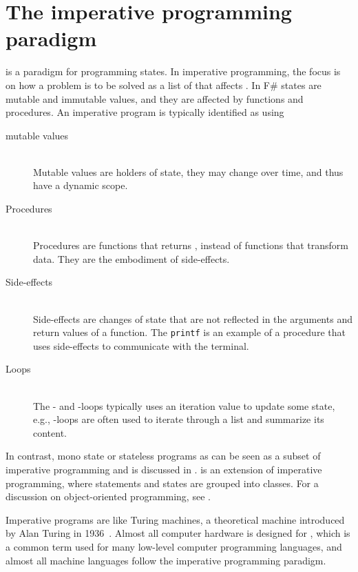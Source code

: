 \chapter{The imperative programming paradigm}
\label{chap:imperative}
 is a paradigm for programming states. In imperative programming, the focus is on how a problem is to be solved as a list of  that affects . In F\# states are mutable and immutable values, and they are affected by functions and procedures. An imperative program is typically identified as using
\begin{description}
\item[mutable values]~\\
Mutable values are holders of state, they may change over time, and thus have a dynamic scope.
\item[Procedures]~\\
 Procedures are functions that returns \lexeme{()}, instead of functions that transform data. They are the embodiment of side-effects.
\item[Side-effects]~\\
Side-effects are changes of state that are not reflected in the arguments and return values of a function. The \lstinline{printf} is an example of a procedure that uses side-effects to communicate with the terminal.
\item[Loops]~\\
The - and -loops typically uses an iteration value to update some state, e.g., -loops are often used to iterate through a list and summarize its content.
\end{description}
In contrast, mono state or stateless programs as  can be seen as a subset of imperative programming and is discussed in .  is an extension of imperative programming, where statements and states are grouped into classes. For a discussion on object-oriented programming, see .

Imperative programs are like Turing machines, a theoretical machine introduced by Alan Turing in 1936~\cite{turing36}. Almost all computer hardware is designed for , which is a common term used for many low-level computer programming languages, and almost all machine languages follow the imperative programming paradigm. 

